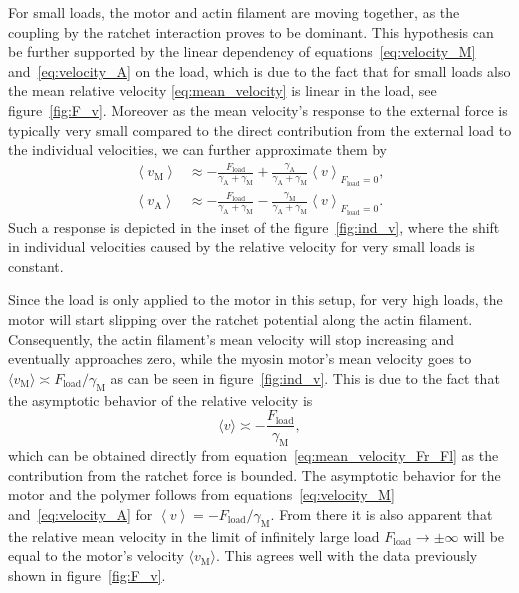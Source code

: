 \documentclass[aps,pre,twocolumn,showpacs,showkeys,superscriptaddress,floatfix]{revtex4-1}
\begin{document}
For small loads, the motor and actin filament are moving together, as the coupling by the ratchet interaction proves to be dominant. 
This hypothesis can be further supported by the linear dependency of equations~\eqref{eq:velocity_M} and~\eqref{eq:velocity_A} on the load, 
which is due to the fact that for small loads also the mean relative velocity \eqref{eq:mean_velocity} is linear in the load, see figure~\ref{fig:F_v}. 
Moreover as the mean velocity's response to the external force is typically very small compared to the direct contribution from the external load to the individual velocities,
we can further approximate them by  
\begin{align*}
\left\langle v_\text{M} \right\rangle 
&\approx - \frac{ F_\text{load} }{ \gamma_\text{A} + \gamma_\text{M} } + \frac{ \gamma_\text{A} }{ \gamma_\text{A} + \gamma_\text{M} } \left\langle v \right\rangle_{ F_\text{load} = 0 },
\\
\left\langle v_\text{A} \right\rangle 
&\approx - \frac{ F_\text{load} }{ \gamma_\text{A} + \gamma_\text{M} } - \frac{ \gamma_\text{M} }{ \gamma_\text{A} + \gamma_\text{M} } \left\langle v \right\rangle_{ F_\text{load} = 0 } .
\end{align*}
Such a response is depicted in the inset of the figure~\ref{fig:ind_v}, where the shift in individual velocities caused by the relative velocity for very small loads is constant.

Since the load is only applied to the motor in this setup, for very high loads, the motor will start slipping over the ratchet potential along the actin filament. 
Consequently, the actin filament's mean velocity will stop increasing and eventually approaches zero, 
while the myosin motor's mean velocity goes to $\langle v_\text{M} \rangle \asymp F_\text{load}/\gamma_\text{M} $
as can be seen in figure~\ref{fig:ind_v}. 
This is due to the fact that the asymptotic behavior of the relative velocity  is
\[
\langle v \rangle \asymp - \frac{ F_\text{load} }{\gamma_\text{M} },
\]
which can be obtained directly from equation~\eqref{eq:mean_velocity_Fr_Fl} as the contribution from the ratchet force is bounded.
The asymptotic behavior for the motor and the polymer follows from equations~\eqref{eq:velocity_M} and~\eqref{eq:velocity_A} for $ \left\langle v \right\rangle = - F_\text{load} / \gamma_\text{M} $. 
From there it is also apparent that the relative mean velocity in the limit of infinitely large load $F_\text{load} \to \pm \infty$ will be equal to the motor's velocity $\langle v_\text{M} \rangle$.
This agrees well with the data previously shown in figure~\ref{fig:F_v}.
\end{document}
